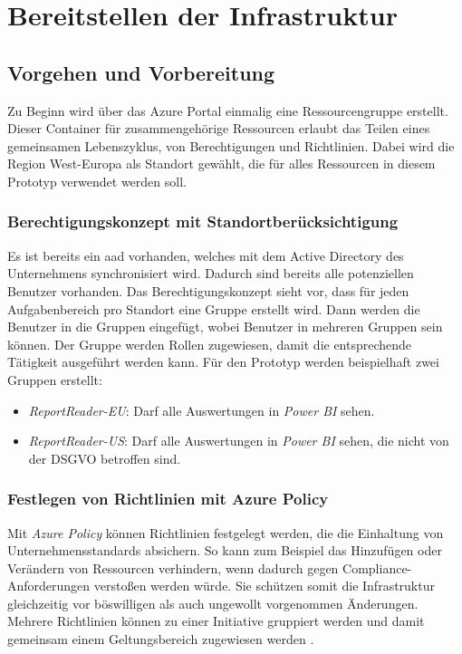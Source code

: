 \section{Bereitstellen der Infrastruktur} \label{sec:infra}

\subsection{Vorgehen und Vorbereitung} \label{subsec:infra:azDevOps}
Zu Beginn wird über das Azure Portal einmalig eine Ressourcengruppe erstellt. Dieser Container für zusammengehörige Ressourcen erlaubt das Teilen eines gemeinsamen Lebenszyklus, von Berechtigungen und Richtlinien. Dabei wird die Region West-Europa als Standort gewählt, die für alles Ressourcen in diesem Prototyp verwendet werden soll.

\subsubsection{Berechtigungskonzept mit Standortberücksichtigung}
Es ist bereits ein \ac{aad} vorhanden, welches mit dem Active Directory des Unternehmens synchronisiert wird. Dadurch sind bereits alle potenziellen Benutzer vorhanden. Das Berechtigungskonzept sieht vor, dass für jeden Aufgabenbereich pro Standort eine Gruppe erstellt wird. Dann werden die Benutzer in die Gruppen eingefügt, wobei Benutzer in mehreren Gruppen sein können. Der Gruppe werden Rollen zugewiesen, damit die entsprechende Tätigkeit ausgeführt werden kann. Für den Prototyp werden beispielhaft zwei Gruppen erstellt:
\begin{itemize}
\item \textit{ReportReader-EU}: Darf alle Auswertungen in \textit{Power BI} sehen.
\item \textit{ReportReader-US}: Darf alle Auswertungen in \textit{Power BI} sehen, die nicht von der DSGVO betroffen sind.
\end{itemize}

\subsubsection{Festlegen von Richtlinien mit Azure Policy} \label{subsec:infra:prep:policy}
Mit \textit{Azure Policy} können Richtlinien festgelegt werden, die die Einhaltung von Unternehmensstandards absichern. So kann zum Beispiel das Hinzufügen oder Verändern von Ressourcen verhindern, wenn dadurch gegen Compliance-Anforderungen verstoßen werden würde. Sie schützen somit die Infrastruktur gleichzeitig vor böswilligen als auch ungewollt vorgenommen Änderungen. Mehrere Richtlinien können zu einer Initiative gruppiert werden und damit gemeinsam einem Geltungsbereich zugewiesen werden \cite{de_tender_azure_2019}.

